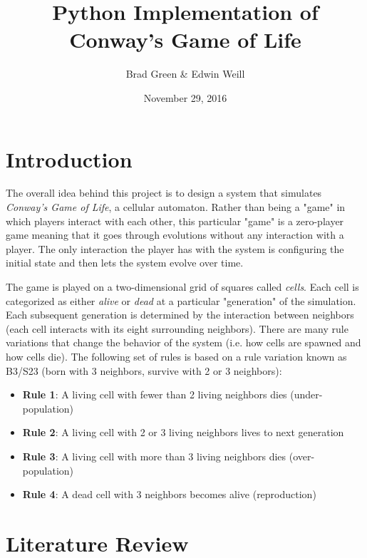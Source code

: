 \documentclass[11pt]{article}
\title{Python Implementation of Conway's Game of Life}
\author{Brad Green \& Edwin Weill}
\date{November 29, 2016}
\begin{document}
\maketitle

\section{Introduction}
The overall idea behind this project is to design a system that simulates \textit{Conway's Game of Life}, a cellular automaton.  Rather than being a "game" in which players interact with each other, this particular "game" is a zero-player game meaning that it goes through evolutions without any interaction with a player.  The only interaction the player has with the system is configuring the initial state and then lets the system evolve over time.
\par
The game is played on a two-dimensional grid of squares called \textit{cells}.  Each cell is categorized as either \textit{alive} or \textit{dead} at a particular "generation" of the simulation.  Each subsequent generation is determined by the interaction between neighbors (each cell interacts with its eight surrounding neighbors).  There are many rule variations that change the behavior of the system (i.e. how cells are spawned and how cells die).  The following set of rules is based on a rule variation known as B3/S23 (born with 3 neighbors, survive with 2 or 3 neighbors):
\begin{itemize}
	\item \textbf{Rule 1}: A living cell with fewer than 2 living neighbors dies (under-population)
	\item \textbf{Rule 2}: A living cell with 2 or 3 living neighbors lives to next generation
	\item \textbf{Rule 3}: A living cell with more than 3 living neighbors dies (over-population)
	\item \textbf{Rule 4}: A dead cell with 3 neighbors becomes alive (reproduction)
\end{itemize}

\section{Literature Review}
\end{document}
